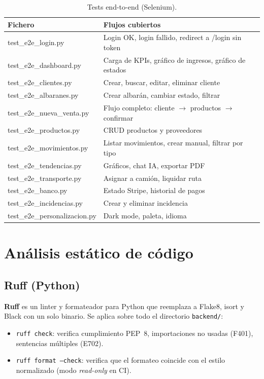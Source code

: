\documentclass[12pt,twoside,titlepage]{report}
\begin{document}
\begin{table}[H]
  \centering
  \caption{Tests end-to-end (Selenium).}
  \label{tab:tests_e2e}
  \begin{tabular}{lp{8cm}}
    \toprule
    \textbf{Fichero} & \textbf{Flujos cubiertos} \\
    \midrule
    test\_e2e\_login.py          & Login OK, login fallido, redirect a /login sin token \\
    test\_e2e\_dashboard.py      & Carga de KPIs, gráfico de ingresos, gráfico de estados \\
    test\_e2e\_clientes.py       & Crear, buscar, editar, eliminar cliente \\
    test\_e2e\_albaranes.py      & Crear albarán, cambiar estado, filtrar \\
    test\_e2e\_nueva\_venta.py   & Flujo completo: cliente $\to$ productos $\to$ confirmar \\
    test\_e2e\_productos.py      & CRUD productos y proveedores \\
    test\_e2e\_movimientos.py    & Listar movimientos, crear manual, filtrar por tipo \\
    test\_e2e\_tendencias.py     & Gráficos, chat IA, exportar PDF \\
    test\_e2e\_transporte.py     & Asignar a camión, liquidar ruta \\
    test\_e2e\_banco.py          & Estado Stripe, historial de pagos \\
    test\_e2e\_incidencias.py    & Crear y eliminar incidencia \\
    test\_e2e\_personalizacion.py& Dark mode, paleta, idioma \\
    \bottomrule
  \end{tabular}
\end{table}


\section{Análisis estático de código}

\subsection{Ruff (Python)}

\textbf{Ruff} \cite{ruff} es un linter y formateador para Python que reemplaza a Flake8, isort y Black con un solo binario. Se aplica sobre todo el directorio \texttt{backend/}:

\begin{itemize}[nosep]
  \item \texttt{ruff check}: verifica cumplimiento PEP~8, importaciones no usadas (F401), sentencias múltiples (E702).
  \item \texttt{ruff format --check}: verifica que el formateo coincide con el estilo normalizado (modo \emph{read-only} en CI).
\end{itemize}
\end{document}
